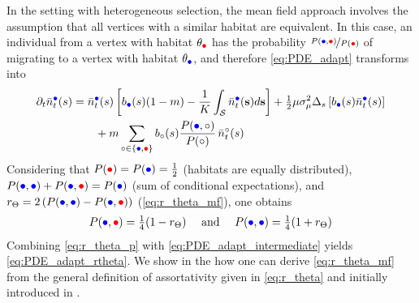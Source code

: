   In the setting with heterogeneous selection, the mean field approach involves the assumption that all vertices with a similar habitat are equivalent. In this case, an individual from a vertex with habitat $\theta_{\rcirc}$ has the probability $\nicefrac{P({\bcirc},{\rcirc})}{P({\rcirc})}$ of migrating to a vertex with habitat $\theta_{\bcirc}$, and therefore \cref{eq:PDE_adapt} transforms into
  \begin{equation}
  \begin{split}\label{eq:PDE_adapt_intermediate}
	  \partial_t \bar{n}_t^{{\bcirc}}(s) &= \bar{n}_t^{{\bcirc}}(s)\left[b_{{\bcirc}}(s) (1-m) -  \frac{1}{K}\int_\mathcal{S}  \bar{n}_t^{{\bcirc}}({\textbf s}) d{\textbf s}  \right] + \tfrac{1}{2} \mu \sigma_\mu^2 \Delta_s \left[ b_{{\bcirc}}(s) \bar{n}_t^{{\bcirc}}(s)\right] \\
	  & \qquad + m \sum_{\circ \in \{{\bcirc},{\rcirc}\}}  b_\circ(s) \frac{P({\bcirc},\circ)}{P(\circ)} \, \bar{n}_t^{\circ}(s)
  \end{split}
  \end{equation}
  Considering that $P({\rcirc}) = P({\bcirc}) = \tfrac{1}{2}$ (habitats are equally distributed), $P(\bcirc,\bcirc) + P(\bcirc,\rcirc) = P(\bcirc) $ (sum of conditional expectations), and $r_\Theta = 2 \left( P({\bcirc},{\bcirc}) - P({\bcirc},{\rcirc}) \right)$ (\cref{eq:r_theta_mf}), one obtains
  \begin{equation}\label{eq:r_theta_p}
	P(\bcirc,\rcirc) = \tfrac{1}{4} (1 - r_\Theta) \quad \text{ and } \quad P(\bcirc,\bcirc) = \tfrac{1}{4} (1 + r_\Theta)
  \end{equation} 
  Combining \cref{eq:r_theta_p} with \cref{eq:PDE_adapt_intermediate} yields \cref{eq:PDE_adapt_rtheta}.
  We show in the  how one can derive \cref{eq:r_theta_mf} from the general definition of assortativity given in \cref{eq:r_theta} and initially introduced in \cite{Newman2003a}.
  
